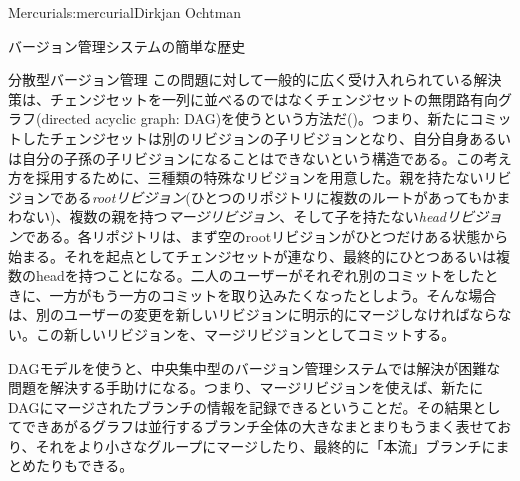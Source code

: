 \begin{aosachapter}{Mercurial}{s:mercurial}{Dirkjan Ochtman}
\begin{aosasect1}{バージョン管理システムの簡単な歴史}
\begin{aosasect2}{分散型バージョン管理}
この問題に対して一般的に広く受け入れられている解決策は、チェンジセットを一列に並べるのではなくチェンジセットの無閉路有向グラフ(directed acyclic graph: DAG)を使うという方法だ()。つまり、新たにコミットしたチェンジセットは別のリビジョンの子リビジョンとなり、自分自身あるいは自分の子孫の子リビジョンになることはできないという構造である。この考え方を採用するために、三種類の特殊なリビジョンを用意した。親を持たないリビジョンである\emph{rootリビジョン}(ひとつのリポジトリに複数のルートがあってもかまわない)、複数の親を持つ\emph{マージリビジョン}、そして子を持たない\emph{headリビジョン}である。各リポジトリは、まず空のrootリビジョンがひとつだけある状態から始まる。それを起点としてチェンジセットが連なり、最終的にひとつあるいは複数のheadを持つことになる。二人のユーザーがそれぞれ別のコミットをしたときに、一方がもう一方のコミットを取り込みたくなったとしよう。そんな場合は、別のユーザーの変更を新しいリビジョンに明示的にマージしなければならない。この新しいリビジョンを、マージリビジョンとしてコミットする。


DAGモデルを使うと、中央集中型のバージョン管理システムでは解決が困難な問題を解決する手助けになる。つまり、マージリビジョンを使えば、新たにDAGにマージされたブランチの情報を記録できるということだ。その結果としてできあがるグラフは並行するブランチ全体の大きなまとまりもうまく表せており、それをより小さなグループにマージしたり、最終的に「本流」ブランチにまとめたりもできる。


\end{aosasect2}
\end{aosasect1}
\end{aosachapter}
